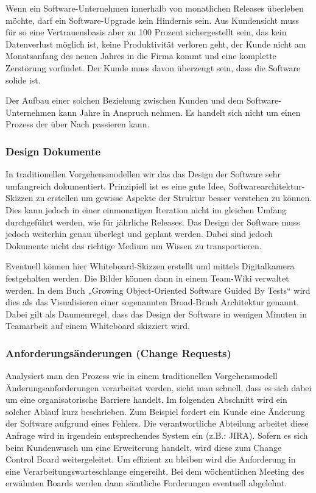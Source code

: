 Wenn ein Software-Unternehmen innerhalb von monatlichen Releases überleben möchte, darf ein Software-Upgrade kein Hindernis sein. Aus Kundensicht muss für so eine Vertrauensbasis aber zu 100 Prozent sichergestellt sein, das kein Datenverlust möglich ist, keine Produktivität verloren geht, der Kunde nicht am Monatsanfang des neuen Jahres in die Firma kommt und eine komplette Zerstörung vorfindet. Der Kunde muss davon überzeugt sein, dass die Software solide ist. 

Der Aufbau einer solchen Beziehung zwischen Kunden und dem Software-Unternehmen kann Jahre in Anspruch nehmen. Es handelt sich nicht um einen Prozess der über Nach passieren kann.

\subsubsection{Design Dokumente}
In traditionellen Vorgehensmodellen wir das das Design der Software sehr umfangreich dokumentiert. Prinzipiell ist es eine gute Idee, Softwarearchitektur-Skizzen zu erstellen um gewisse Aspekte der Struktur besser verstehen zu können. Dies kann jedoch in einer einmonatigen Iteration nicht im gleichen Umfang durchgeführt werden, wie für jährliche Releases. Das Design der Software muss jedoch weiterhin genau überlegt und geplant werden. Dabei sind jedoch Dokumente nicht das richtige Medium um Wissen zu transportieren. 

Eventuell können hier Whiteboard-Skizzen erstellt und mittels Digitalkamera festgehalten werden. Die Bilder können dann in einem Team-Wiki verwaltet werden. In dem Buch „Growing Object-Oriented Software Guided By Tests“ wird dies als das Visualisieren einer sogenannten Broad-Brush Architektur genannt. Dabei gilt als Daumenregel, dass das Design der Software in wenigen Minuten in Teamarbeit auf einem Whiteboard skizziert wird. 

\subsubsection{Anforderungsänderungen (Change Requests)}
Analysiert man den Prozess wie in einem traditionellen Vorgehensmodell Änderungsanforderungen verarbeitet werden, sieht man schnell, dass es sich dabei um eine organisatorische Barriere handelt. Im folgenden Abschnitt wird ein solcher Ablauf kurz beschrieben. Zum Beispiel fordert ein Kunde eine Änderung der Software aufgrund eines Fehlers. Die verantwortliche Abteilung arbeitet diese Anfrage wird in irgendein entsprechendes System ein (z.B.: JIRA). Sofern es sich beim Kundenwusch um eine Erweiterung handelt, wird diese zum Change Control Board weitergeleitet. Um effizient zu bleiben wird die Anforderung in eine Verarbeitungswarteschlange eingereiht. Bei dem wöchentlichen Meeting des erwähnten Boards werden dann sämtliche Forderungen eventuell abgelehnt.

